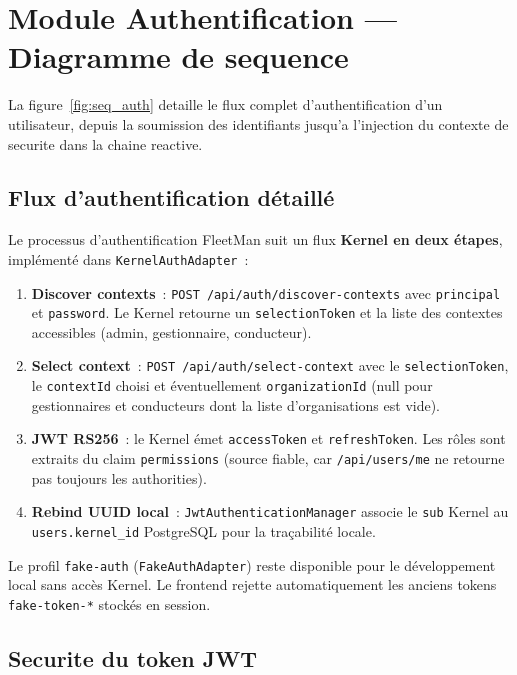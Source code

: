 \documentclass[12pt,a4paper]{report}
\begin{document}
\section{Module Authentification --- Diagramme de sequence}

La figure~\ref{fig:seq_auth} detaille le flux complet d'authentification
d'un utilisateur, depuis la soumission des identifiants jusqu'a
l'injection du contexte de securite dans la chaine reactive.

\subsection{Flux d'authentification détaillé}

Le processus d'authentification FleetMan suit un flux \textbf{Kernel en deux
étapes}, implémenté dans \texttt{KernelAuthAdapter}~:

\begin{enumerate}[leftmargin=2cm]
  \item \textbf{Discover contexts}~: \texttt{POST /api/auth/discover-contexts}
        avec \texttt{principal} et \texttt{password}. Le Kernel retourne un
        \texttt{selectionToken} et la liste des contextes accessibles
        (admin, gestionnaire, conducteur).
  \item \textbf{Select context}~: \texttt{POST /api/auth/select-context} avec
        le \texttt{selectionToken}, le \texttt{contextId} choisi et
        éventuellement \texttt{organizationId} (null pour gestionnaires
        et conducteurs dont la liste d'organisations est vide).
  \item \textbf{JWT RS256}~: le Kernel émet \texttt{accessToken} et
        \texttt{refreshToken}. Les rôles sont extraits du claim
        \texttt{permissions} (source fiable, car \texttt{/api/users/me}
        ne retourne pas toujours les authorities).
  \item \textbf{Rebind UUID local}~: \texttt{JwtAuthenticationManager} associe
        le \texttt{sub} Kernel au \texttt{users.kernel\_id} PostgreSQL pour
        la traçabilité locale.
\end{enumerate}

Le profil \texttt{fake-auth} (\texttt{FakeAuthAdapter}) reste disponible pour
le développement local sans accès Kernel. Le frontend rejette automatiquement
les anciens tokens \texttt{fake-token-*} stockés en session.

\subsection{Securite du token JWT}
\end{document}
